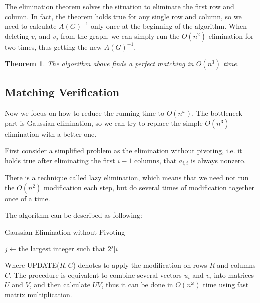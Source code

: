 \documentclass{article}
\newtheorem{theorem}{Theorem}
\begin{document}
			The elimination theorem solves the situation to eliminate the first row and column. In fact, the theorem holds true for any single row and column, so we need to calculate $A(G)^{-1}$ only once at the beginning of the algorithm. When deleting $v_i$ and $v_j$ from the graph, we can simply run the $O(n^2)$ elimination for two times, thus getting the new $A(G)^{-1}$.

			\begin{theorem}
				The algorithm above finds a perfect matching in $O(n^3)$ time.
			\end{theorem}

		\subsection{Matching Verification}

			Now we focus on how to reduce the running time to $O(n^\omega)$. The bottleneck part is Gaussian elimination, so we can try to replace the simple $O(n^3)$ elimination with a better one.

			First consider a simplified problem as the elimination without pivoting, i.e. it holds true after eliminating the first $i - 1$ columns, that $a_{i, i}$ is always nonzero.

			There is a technique called lazy elimination, which means that we need not run the $O(n^2)$ modification each step, but do several times of modification together once of a time.

			The algorithm can be described as following:

			\begin{algorithm}
				\caption{Gaussian Elimination without Pivoting}
				\label{simple}

				\begin{algorithmic}[1]
							\State $j \gets \text{the largest integer such that } 2^j | i$
						\EndFor
					\EndFunction
				\end{algorithmic}

			\end{algorithm}

			Where UPDATE($R, C$) denotes to apply the modification on rows $R$ and columns $C$. The procedure is equivalent to combine several vectors $u_i$ and $v_i$ into matrices $U$ and $V$, and then calculate $UV$, thus it can be done in $O(n^\omega)$ time using fast matrix multiplication.
\end{document}
